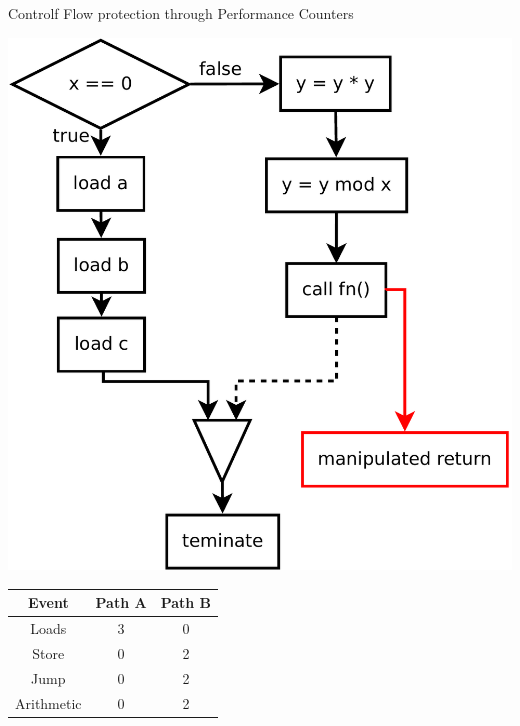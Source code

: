 \documentclass[aspectratio=169]{beamer}
\begin{document}
\begin{frame}{Controlf Flow protection through Performance Counters}
    \begin{center}
        \begin{minipage}{0.5\linewidth}
            \begin{center}
                \includegraphics[width=.83\textwidth]{images/control_flow_1.pdf}
            \end{center}
        \end{minipage}
        \hfill
        \begin{minipage}{0.4\linewidth}
            \begin{center}
                \begin{tabular}{c|c|c}
                    Event      & Path A & Path B \\
                    \hline
                    Loads      & 3      & 0      \\
                    Store      & 0      & 2      \\
                    Jump       & 0      & 2      \\
                    Arithmetic & 0      & 2      \\
                \end{tabular}
            \end{center}
        \end{minipage}
    \end{center}
\end{frame}
\end{document}
